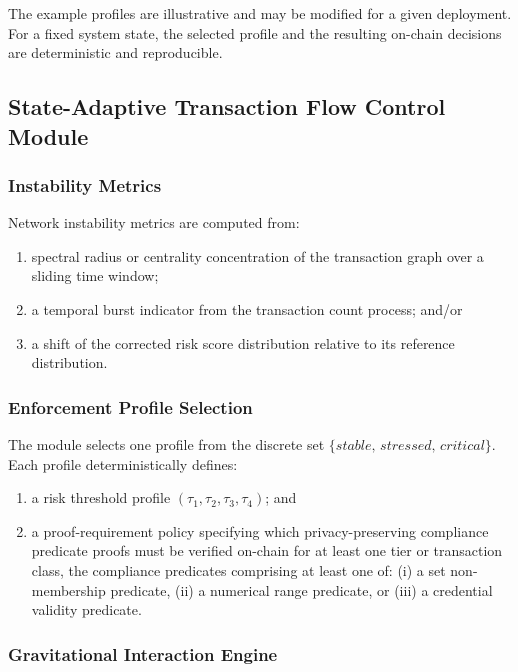 \documentclass[12pt,a4paper]{article}
\begin{document}
The example profiles are illustrative and may be modified for a given
deployment. For a fixed system state, the selected profile and the resulting
on-chain decisions are deterministic and reproducible.

\subsection{State-Adaptive Transaction Flow Control Module}
\label{sec:af}

\subsubsection{Instability Metrics}

Network instability metrics are computed from:
\begin{enumerate}[label=(\alph*)]
\item spectral radius or centrality concentration of the transaction graph
over a sliding time window;
\item a temporal burst indicator from the transaction count process; and/or
\item a shift of the corrected risk score distribution relative to its
reference distribution.
\end{enumerate}

\subsubsection{Enforcement Profile Selection}

The module selects one profile from the discrete set
$\{\textit{stable},\, \textit{stressed},\, \textit{critical}\}$.
Each profile deterministically defines:
\begin{enumerate}[label=(\alph*)]
\item a risk threshold profile $(\tau_1,\tau_2,\tau_3,\tau_4)$; and
\item a proof-requirement policy specifying which privacy-preserving
compliance predicate proofs must be verified on-chain for at least one tier
or transaction class, the compliance predicates comprising at least one of:
(i) a set non-membership predicate, (ii) a numerical range predicate, or
(iii) a credential validity predicate.
\end{enumerate}

\subsubsection{Gravitational Interaction Engine}
\end{document}
